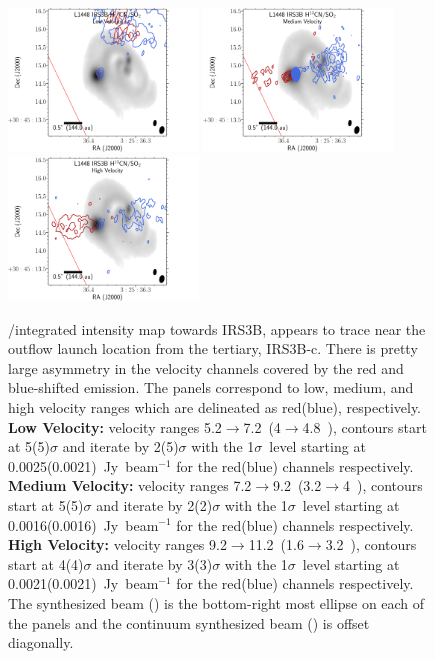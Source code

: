 \begin{figure}[H]
\begin{center}
   \includegraphics[width=0.45\textwidth]{img/L1448IRS3B_H13CN_clean_image_2_binned__low.pdf}
   \includegraphics[width=0.45\textwidth]{img/L1448IRS3B_H13CN_clean_image_2_binned__med.pdf}
   \includegraphics[width=0.45\textwidth]{img/L1448IRS3B_H13CN_clean_image_2_binned__high.pdf} %
\end{center}
   \caption{\htcn/\sot\space integrated intensity map towards IRS3B, appears to trace near the outflow launch location from the tertiary, IRS3B-c. There is pretty large asymmetry in the velocity channels covered by the red and blue-shifted emission. The panels correspond to low, medium, and high velocity ranges which are delineated as red(blue), respectively. \textbf{Low Velocity:} velocity ranges 5.2$\rightarrow$7.2~\kms (4$\rightarrow$4.8~\kms), contours start at 5(5)$\sigma$ and iterate by 2(5)$\sigma$ with the 1$\sigma$~level starting at 0.0025(0.0021)~Jy~beam$^{-1}$ for the red(blue) channels respectively. \textbf{Medium Velocity:} velocity ranges 7.2$\rightarrow$9.2~\kms (3.2$\rightarrow$4~\kms), contours start at 5(5)$\sigma$ and iterate by 2(2)$\sigma$ with the 1$\sigma$~level starting at 0.0016(0.0016)~Jy~beam$^{-1}$ for the red(blue) channels respectively. \textbf{High Velocity:} velocity ranges 9.2$\rightarrow$11.2~\kms (1.6$\rightarrow$3.2~\kms), contours start at 4(4)$\sigma$ and iterate by 3(3)$\sigma$ with the 1$\sigma$~level starting at 0.0021(0.0021)~Jy~beam$^{-1}$ for the red(blue) channels respectively. The \htcn\space synthesized beam (\htcnbeam) is the bottom-right most ellipse on each of the panels and the continuum synthesized beam (\contbeam) is offset diagonally.}\label{fig:irs3bh13cnmoment}
\end{figure}







